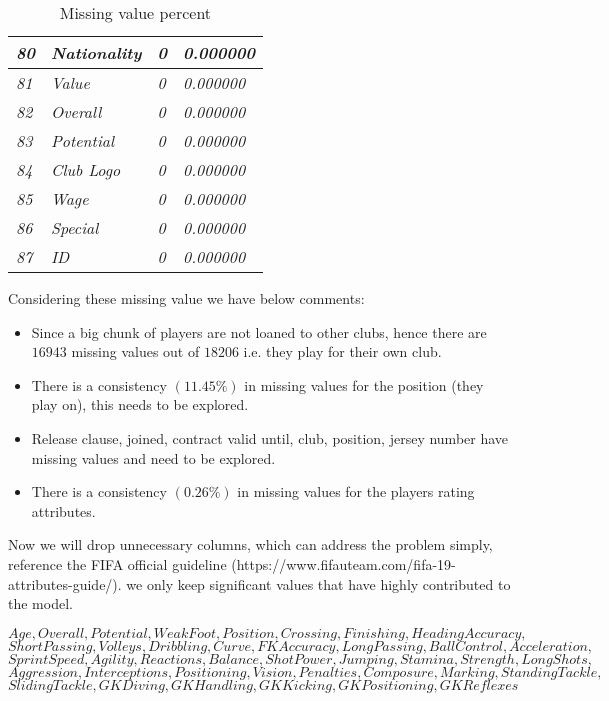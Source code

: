 \documentclass{article}
\begin{document}
\begin{table}[]
\begin{tabular}{|l|l|l|l|}
\textit{80}    & \textit{Nationality}          & \textit{0}             & \textit{0.000000}        \\ \hline
\textit{81}    & \textit{Value}                & \textit{0}             & \textit{0.000000}        \\ \hline
\textit{82}    & \textit{Overall}              & \textit{0}             & \textit{0.000000}        \\ \hline
\textit{83}    & \textit{Potential}            & \textit{0}             & \textit{0.000000}        \\ \hline
\textit{84}    & \textit{Club Logo}            & \textit{0}             & \textit{0.000000}        \\ \hline
\textit{85}    & \textit{Wage}                 & \textit{0}             & \textit{0.000000}        \\ \hline
\textit{86}    & \textit{Special}              & \textit{0}             & \textit{0.000000}        \\ \hline
\textit{87}    & \textit{ID}                   & \textit{0}             & \textit{0.000000}        \\ \hline
\end{tabular}
\caption{Missing value percent}
\end{table}
\newpage


Considering these missing value we have below comments:
\begin{itemize}
    \item Since a big chunk of players are not loaned to other clubs, hence there are $16943$ missing values out of $18206$ i.e. they play for their own club.
    \item There is a consistency $(11.45\%)$ in missing values for the position (they play on), this needs to be explored.
    \item Release clause, joined, contract valid until, club, position, jersey number have missing values and need to be explored.
    \item There is a consistency $(0.26\%)$ in missing values for the players rating attributes.
\end{itemize}
\par Now we will drop unnecessary columns, which can address the problem simply, reference the FIFA official guideline (https://www.fifauteam.com/fifa-19-attributes-guide/). we only keep significant values that have highly contributed to the model.

\begin{center}
$Age, Overall, Potential, Weak Foot, Position, Crossing, Finishing, HeadingAccuracy,$ \\
$ShortPassing, Volleys, Dribbling, Curve, FKAccuracy, LongPassing, BallControl, Acceleration,$ \\
$SprintSpeed, Agility, Reactions, Balance, ShotPower, Jumping, Stamina, Strength, LongShots,$\\
$Aggression, Interceptions, Positioning, Vision, Penalties, Composure, Marking, StandingTackle,$ \\
$SlidingTackle, GKDiving, GKHandling, GKKicking, GKPositioning, GKReflexes$
\end{center}
\end{document}
